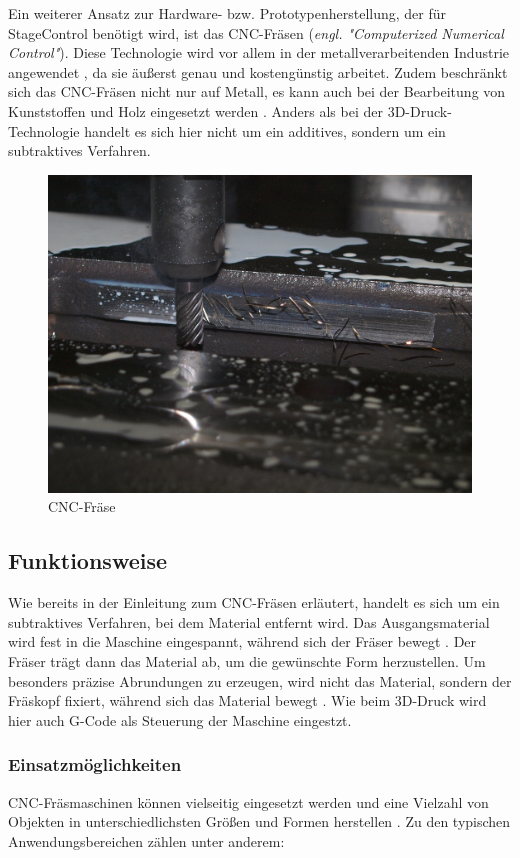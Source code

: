 Ein weiterer Ansatz zur Hardware- bzw. Prototypenherstellung, der für StageControl benötigt wird, ist das CNC-Fräsen (\textit{engl. "Computerized Numerical Control"}). Diese Technologie wird vor allem in der metallverarbeitenden Industrie angewendet \parencite{CNCFraesen}, da sie äußerst genau und kostengünstig arbeitet. Zudem beschränkt sich das CNC-Fräsen nicht nur auf Metall, es kann auch bei der Bearbeitung von Kunststoffen und Holz eingesetzt werden \parencite{CNCFraesen2}. Anders als bei der 3D-Druck-Technologie handelt es sich hier nicht um ein additives, sondern um ein subtraktives Verfahren.\\  \parencite{CNCFraesen3}


\begin{figure}[H]
	\centering
	\includegraphics[width=0.6\linewidth]{images/CNC.jpg}
	\caption[CNC-Fräse]{CNC-Fräse}
	\label{fig:cnc-fraese}
\end{figure}

\subsection{Funktionsweise}
Wie bereits in der Einleitung zum CNC-Fräsen erläutert, handelt es sich um ein subtraktives Verfahren, bei dem Material entfernt wird. Das Ausgangsmaterial wird fest in die Maschine eingespannt, während sich der Fräser bewegt \parencite{CNCFraesen2}. Der Fräser trägt dann das Material ab, um die gewünschte Form herzustellen. Um besonders präzise Abrundungen zu erzeugen, wird nicht das Material, sondern der Fräskopf fixiert, während sich das Material bewegt  \parencite{CNCFraesen3}. Wie beim 3D-Druck wird hier auch G-Code als Steuerung der Maschine eingestzt. \\


\newpage
\subsubsection{Einsatzmöglichkeiten}
CNC-Fräsmaschinen können vielseitig eingesetzt werden und eine Vielzahl von Objekten in unterschiedlichsten Größen und Formen herstellen  \parencite{CNCFraesen2}. Zu den typischen Anwendungsbereichen zählen unter anderem:

